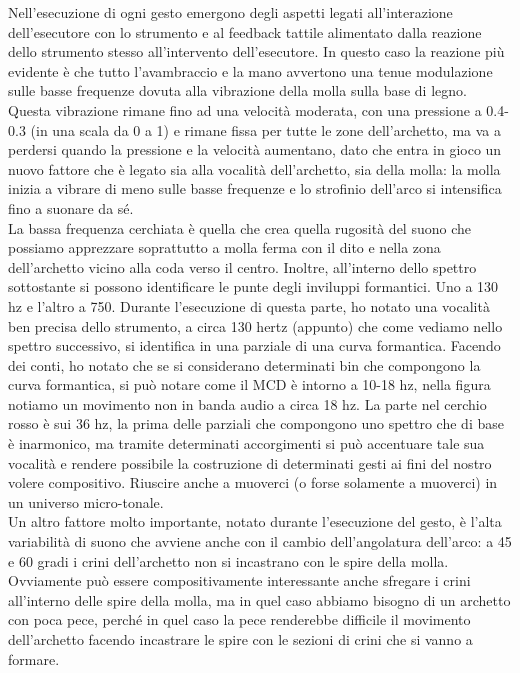 Nell’esecuzione di ogni gesto emergono degli aspetti legati all’interazione dell’esecutore con lo strumento e al feedback tattile alimentato dalla reazione dello strumento stesso all’intervento dell’esecutore. In questo caso la reazione più evidente è che tutto l’avambraccio e la mano avvertono una tenue modulazione sulle basse frequenze dovuta alla vibrazione della molla sulla base di legno. Questa vibrazione rimane fino ad una velocità moderata, con una pressione a 0.4-0.3 (in una scala da 0 a 1) e rimane fissa per tutte le zone dell’archetto, ma va a perdersi quando la pressione e la velocità aumentano, dato che entra in gioco un nuovo fattore che è legato sia alla vocalità dell’archetto, sia della molla: la molla inizia a vibrare di meno sulle basse frequenze e lo strofinio dell’arco si intensifica fino a suonare da sé.  \\
La bassa frequenza cerchiata è quella che crea quella rugosità del suono che possiamo apprezzare soprattutto a molla ferma con il dito e nella zona dell’archetto vicino alla coda verso il centro. Inoltre, all’interno dello spettro sottostante si possono identificare le punte degli inviluppi formantici. Uno a 130 hz e l’altro a 750. Durante l’esecuzione di questa parte, ho notato una vocalità ben precisa dello strumento, a circa 130 hertz (appunto) che come vediamo nello spettro successivo, si identifica in una parziale di una curva formantica. Facendo dei conti, ho notato che se si considerano determinati bin che compongono la curva formantica, si può notare come il MCD è intorno a 10-18 hz, nella figura notiamo un movimento non in banda audio a circa 18 hz. La parte nel cerchio rosso è sui 36 hz, la prima delle parziali che compongono uno spettro che di base è inarmonico, ma tramite determinati accorgimenti si può accentuare tale sua vocalità e rendere possibile la costruzione di determinati gesti ai fini del nostro volere compositivo. Riuscire anche a muoverci (o forse solamente a muoverci) in un universo micro-tonale. \\
Un altro fattore molto importante, notato durante l’esecuzione del gesto, è l’alta variabilità di suono che avviene anche con il cambio dell’angolatura dell’arco: a 45 e 60 gradi i crini dell’archetto non si incastrano con le spire della molla. Ovviamente può essere compositivamente interessante anche sfregare i crini all’interno delle spire della molla, ma in quel caso abbiamo bisogno di un archetto con poca pece, perché in quel caso la pece renderebbe difficile il movimento dell’archetto facendo incastrare le spire con le sezioni di crini che si vanno a formare.  \\
